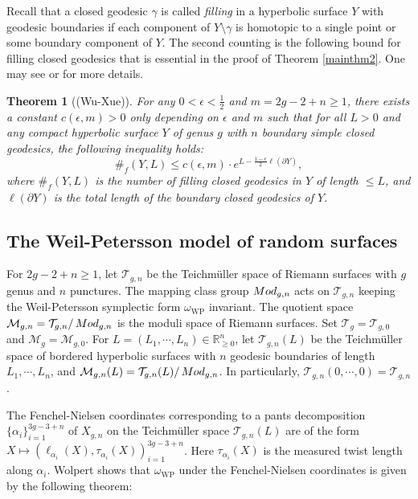\documentclass[11pt]{amsart}
\newcommand{\calT}{\mathcal{T}}
\newcommand{\T}{\calT}
\newcommand{\M}{\mathcal{M}}
\newcommand{\R}{\mathbb{R}}
\newcommand{\eps}{\epsilon}
\def\Mod{\mathop{\rm Mod}}
\theoremstyle{plain}
\newtheorem{theorem}{Theorem}
\theoremstyle{definition}
\theoremstyle{remark}
\begin{document}
Recall that a  closed geodesic $\gamma$ is called \emph{filling} in a hyperbolic surface $Y$ with geodesic boundaries if each component of $Y\setminus \gamma$ is homotopic to a single point or some boundary component of $Y$. The second counting is the following bound for filling closed geodesics that  is essential in the proof of Theorem \ref{mainthm2}. One may see \cite[Theorem 4]{wu2022random} or \cite[Theorem 18]{WX22pgt} for more details. 
\begin{theorem}[(Wu-Xue)]\label{wuxue counting}
For any  $0<\eps<\frac{1}{2}$ and $m=2g-2+n\geq 1$, there exists
	a constant $c(\eps,m)>0$ only depending on $\eps$ and $m$ such that for all $L>0$ and any compact hyperbolic surface $Y$ of genus $g$ with $n$ boundary simple closed geodesics, the following inequality holds:
	$$\#_{f}(Y,L)\leq c(\eps,m)\cdot  e^{L-\frac{1-\eps}{2}\ell(\partial Y)},$$
	where $\#_{f}(Y,L)$ is the number of filling closed geodesics in $Y$ of length $\leq L$, and 
 $\ell(\partial Y)$ is the total length of the boundary closed geodesics of $Y$.
\end{theorem}



\subsection{The Weil-Petersson model of random surfaces}
For $2g-2+n\geq 1$, let $\T_{g,n}$ be the Teichm\"uller space of Riemann surfaces with $g$ genus and $n$ punctures.
The mapping class group  $\Mod_{g,n}$ acts on $\T_{g,n}$ keeping the Weil-Petersson symplectic form $\omega_{\mathrm{WP}}$ invariant. The quotient space  $\M_{g,n}=\T_{g,n}/\Mod_{g,n}$ is the moduli space of Riemann surfaces.  Set $\T_g=\T_{g,0}$ and  $\M_{g}=\M_{g,0}$. For  $L=(L_1,\cdots,L_n)\in \R^n_{\geq 0}$, let $\T_{g,n}(L)$ be the Teichm\"uller space of bordered hyperbolic surfaces with $n$ geodesic boundaries of length $L_1,\cdots,L_n$, and $\M_{g,n}(L)=\T_{g,n}(L)/\Mod_{g,n}$. In particularly, $\T_{g,n}(0,\cdots,0)=\T_{g,n}$.

The Fenchel-Nielsen coordinates corresponding to a pants decomposition $\{\alpha_i\}_{i=1}^{3g-3+n}$ of $X_{g,n}$ on the Teichm\"uller space $\T_{g,n}(L)$ are of the form  $X\mapsto (\ell_{\alpha_i}(X),\tau_{\alpha_i}(X))_{i=1}^{3g-3+n}$. Here $\tau_{\alpha_i}(X)$ is the  measured twist length along $\alpha_i$. Wolpert \cite{Wolpert82} shows that $\omega_{\mathrm{WP}}$  under the Fenchel-Nielsen coordinates is given by the following theorem: 
\end{document}

